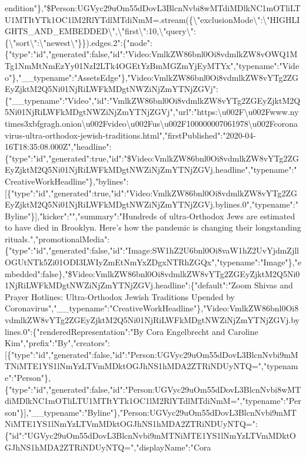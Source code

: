 endition"\},"\$Person:UGVyc29uOm55dDovL3BlcnNvbi8wMTdiMDlkNC1mOTliLTU1MTItYTk1OC1lM2RlYTdlMTdiNmM=.stream(\{\textbackslash{}"exclusionMode\textbackslash{}":\textbackslash{}"HIGHLIGHTS\_AND\_EMBEDDED\textbackslash{}",\textbackslash{}"first\textbackslash{}":10,\textbackslash{}"query\textbackslash{}":\{\textbackslash{}"sort\textbackslash{}":\textbackslash{}"newest\textbackslash{}"\}\}).edges.2":\{"node":\{"type":"id","generated":false,"id":"Video:VmlkZW86bnl0Oi8vdmlkZW8vOWQ1MTg1NmMtNmEzYy01NzI2LTk4OGEtYzBmMGZmYjEyMTYx","typename":"Video"\},"\_\_typename":"AssetsEdge"\},"Video:VmlkZW86bnl0Oi8vdmlkZW8vYTg2ZGEyZjktM2Q5Ni01NjRiLWFkMDgtNWZiNjZmYTNjZGVj":\{"\_\_typename":"Video","id":"VmlkZW86bnl0Oi8vdmlkZW8vYTg2ZGEyZjktM2Q5Ni01NjRiLWFkMDgtNWZiNjZmYTNjZGVj","url":"https:\textbackslash{}u002F\textbackslash{}u002Fwww.nytimes3xbfgragh.onion\textbackslash{}u002Fvideo\textbackslash{}u002Fus\textbackslash{}u002F100000007061978\textbackslash{}u002Fcoronavirus-ultra-orthodox-jewish-traditions.html","firstPublished":"2020-04-16T18:35:08.000Z","headline":\{"type":"id","generated":true,"id":"\$Video:VmlkZW86bnl0Oi8vdmlkZW8vYTg2ZGEyZjktM2Q5Ni01NjRiLWFkMDgtNWZiNjZmYTNjZGVj.headline","typename":"CreativeWorkHeadline"\},"bylines":{[}\{"type":"id","generated":true,"id":"Video:VmlkZW86bnl0Oi8vdmlkZW8vYTg2ZGEyZjktM2Q5Ni01NjRiLWFkMDgtNWZiNjZmYTNjZGVj.bylines.0","typename":"Byline"\}{]},"kicker":"","summary":"Hundreds
of ultra-Orthodox Jews are estimated to have died in Brooklyn. Here's
how the pandemic is changing their longstanding
rituals.","promotionalMedia":\{"type":"id","generated":false,"id":"Image:SW1hZ2U6bnl0Oi8vaW1hZ2UvYjdmZjllOGUtNTk5Zi01ODI3LWIyZmEtNmYxZDgxNTRhZGQx","typename":"Image"\},"embedded":false\},"\$Video:VmlkZW86bnl0Oi8vdmlkZW8vYTg2ZGEyZjktM2Q5Ni01NjRiLWFkMDgtNWZiNjZmYTNjZGVj.headline":\{"default":"Zoom
Shivas and Prayer Hotlines: Ultra-Orthodox Jewish Traditions Upended by
Coronavirus","\_\_typename":"CreativeWorkHeadline"\},"Video:VmlkZW86bnl0Oi8vdmlkZW8vYTg2ZGEyZjktM2Q5Ni01NjRiLWFkMDgtNWZiNjZmYTNjZGVj.bylines.0":\{"renderedRepresentation":"By
Cora Engelbrecht and Caroline
Kim","prefix":"By","creators":{[}\{"type":"id","generated":false,"id":"Person:UGVyc29uOm55dDovL3BlcnNvbi9mMTNiMTE1YS1lNmYzLTVmMDktOGJhNS1hMDA2ZTRiNDUyNTQ=","typename":"Person"\},\{"type":"id","generated":false,"id":"Person:UGVyc29uOm55dDovL3BlcnNvbi8wMTdiMDlkNC1mOTliLTU1MTItYTk1OC1lM2RlYTdlMTdiNmM=","typename":"Person"\}{]},"\_\_typename":"Byline"\},"Person:UGVyc29uOm55dDovL3BlcnNvbi9mMTNiMTE1YS1lNmYzLTVmMDktOGJhNS1hMDA2ZTRiNDUyNTQ=":\{"id":"UGVyc29uOm55dDovL3BlcnNvbi9mMTNiMTE1YS1lNmYzLTVmMDktOGJhNS1hMDA2ZTRiNDUyNTQ=","displayName":"Cora
